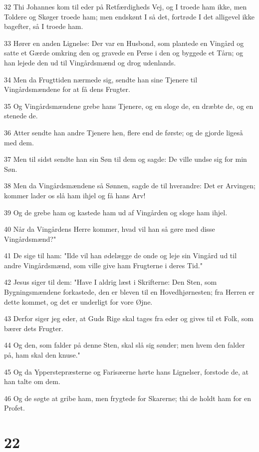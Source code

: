 \par 32 Thi Johannes kom til eder på Retfærdigheds Vej, og I troede ham ikke, men Toldere og Skøger troede ham; men endskønt I så det, fortrøde I det alligevel ikke bagefter, så I troede ham.
\par 33 Hører en anden Lignelse: Der var en Husbond, som plantede en Vingård og satte et Gærde omkring den og gravede en Perse i den og byggede et Tårn; og han lejede den ud til Vingårdsmænd og drog udenlands.
\par 34 Men da Frugttiden nærmede sig, sendte han sine Tjenere til Vingårdsmændene for at få dens Frugter.
\par 35 Og Vingårdsmændene grebe hans Tjenere, og en sloge de, en dræbte de, og en stenede de.
\par 36 Atter sendte han andre Tjenere hen, flere end de første; og de gjorde ligeså med dem.
\par 37 Men til sidst sendte han sin Søn til dem og sagde: De ville undse sig for min Søn.
\par 38 Men da Vingårdsmændene så Sønnen, sagde de til hverandre: Det er Arvingen; kommer lader os slå ham ihjel og få hans Arv!
\par 39 Og de grebe ham og kastede ham ud af Vingården og sloge ham ihjel.
\par 40 Når da Vingårdens Herre kommer, hvad vil han så gøre med disse Vingårdsmænd?"
\par 41 De sige til ham: "Ilde vil han ødelægge de onde og leje sin Vingård ud til andre Vingårdsmænd, som ville give ham Frugterne i deres Tid."
\par 42 Jesus siger til dem: "Have I aldrig læst i Skrifterne: Den Sten, som Bygningsmændene forkastede, den er bleven til en Hovedhjørnesten; fra Herren er dette kommet, og det er underligt for vore Øjne.
\par 43 Derfor siger jeg eder, at Guds Rige skal tages fra eder og gives til et Folk, som bærer dets Frugter.
\par 44 Og den, som falder på denne Sten, skal slå sig sønder; men hvem den falder på, ham skal den knuse."
\par 45 Og da Ypperstepræsterne og Farisæerne hørte hans Lignelser, forstode de, at han talte om dem.
\par 46 Og de søgte at gribe ham, men frygtede for Skarerne; thi de holdt ham for en Profet.

\chapter{22}

